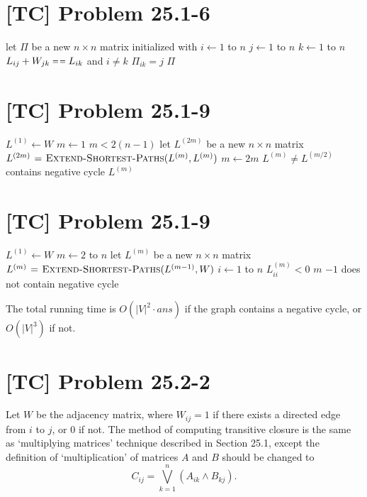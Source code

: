 \documentclass[a4paper,11pt,twocolumn]{article}
\newcommand{\NIL}{\const{nil}}
\begin{document}
  \section{[TC] Problem 25.1-6}
  \begin{codebox}
    \li let $\Pi$ be a new $n \times n$ matrix initialized with \NIL
    \li \For $i \gets 1$ to $n$
    \li \Do  \For $j \gets 1$ to $n$
    \li      \Do  \For $k \gets 1$ to $n$
    \li           \Do  \If $L_{ij}+ W_{jk} \isequal L_{ik}$ and $i \neq k$
    \li                \Do $\Pi_{ik} = j$
                       \End
                  \End
             \End
        \End
    \li \Return $\Pi$
  \end{codebox}

  \section{[TC] Problem 25.1-9}
  \begin{codebox}
    \li $L^{(1)} \gets W$
    \li $m \gets 1$
    \li \While $m < 2(n-1)$
    \li \Do let $L^{(2m)}$ be a new $n \times n$ matrix
    \li     $L^{(2m)} \mathrel{\hspace{1pt}=\hspace{1pt}}  \textnormal{\scshape Extend-Shortest-Paths}(L^{(m)}, L^{(m)})$
    \li     $m \gets 2m$
        \End
    \li \If $L^{(m)} \neq L^{(m/2)}$
    \li \Do \Error contains negative cycle
        \End
    \li \Return $L^{(m)}$
  \end{codebox}

  \section{[TC] Problem 25.1-9}
  \begin{codebox}
    \li $L^{(1)} \gets W$
    \li \For $m \gets 2$ to $n$
    \li \Do  let $L^{(m)}$ be a new $n \times n$ matrix
    \li      $L^{(m)} \mathrel{\hspace{1pt}=\hspace{1pt}} \textnormal{\scshape Extend-Shortest-Paths}(L^{(m-1)}, W)$
    \li      \For $i \gets 1$ to $n$
    \li      \Do  \If $L^{(m)}_{ii} < 0$
    \li           \Do \Return $m$
                  \End
             \End
        \End
    \li \Return $-1$ \Comment does not contain negative cycle
  \end{codebox}
  The total running time is $O(|V|^2 \cdot ans)$ if the graph contains a negative cycle, or $O(|V|^3)$ if not.

  \section{[TC] Problem 25.2-2}
  Let $W$ be the adjacency matrix, where $W_{ij} = 1$ if there exists a directed edge from $i$ to $j$, or $0$ if not. The method of computing transitive closure is the same as `multiplying matrices' technique described in Section 25.1, except the definition of `multiplication' of matrices $A$ and $B$ should be changed to
  $$ C_{ij} = \bigvee_{k = 1}^n (A_{ik} \wedge B_{kj}) .$$
\end{document}
